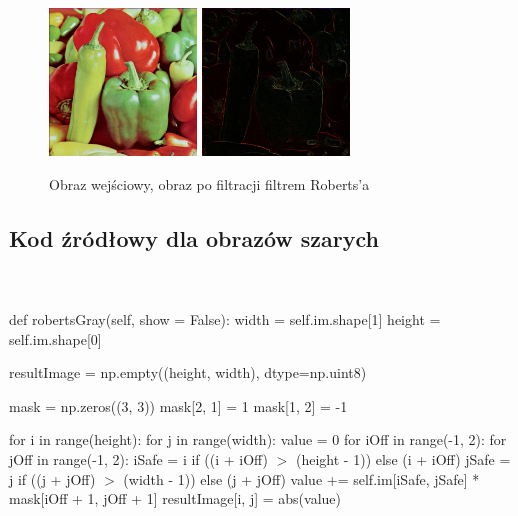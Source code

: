 \documentclass[final,a4paper,openany,12pt]{mwbk}
\begin{document}
\begin{figure}[H]
	\begin{center}
		\includegraphics[width=0.35\textwidth]{peppers_color}
		\includegraphics[width=0.35\textwidth]{peppers_color_highpassRoberts_result}
	\end{center}
	\caption{Obraz wejściowy, obraz po filtracji filtrem Roberts'a}
\end{figure}
\newpage

\subsection*{Kod źródłowy dla obrazów szarych}
\hfill
\\\\
\noindent def robertsGray(self, show = False): \newline
\indent width = self.im.shape[1] \newline
\indent height = self.im.shape[0] \newline

resultImage = np.empty((height, width), dtype=np.uint8) \newline

mask = np.zeros((3, 3)) \newline
\indent mask[2, 1] = 1 \newline
\indent mask[1, 2] = -1 \newline

for i in range(height): \newline
\indent for j in range(width): \newline
\indent value = 0 \newline
\indent for iOff in range(-1, 2): \newline
\indent for jOff in range(-1, 2): \newline
\indent iSafe = i if ((i + iOff) $>$ (height - 1)) else (i + iOff) \newline
\indent jSafe = j if ((j + jOff) $>$ (width - 1)) else (j + jOff) \newline
\indent value += self.im[iSafe, jSafe] * mask[iOff + 1, jOff + 1] \newline
\indent resultImage[i, j] = abs(value) \newline
\end{document}
